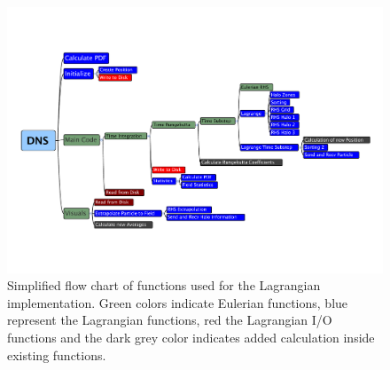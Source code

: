 \documentclass[12pt]{article}
\begin{document}
\begin{figure}[htbp]
	\centering
			\includegraphics[width=\textheight,height=\textwidth, angle=90]{figs/latex_roadmap.pdf}
	\caption[Implementation flow chart]{Simplified flow chart of functions used for the Lagrangian implementation. Green colors indicate Eulerian functions, blue represent the Lagrangian functions, red the Lagrangian I/O functions and the dark grey color indicates added calculation inside existing functions.}
	\label{fig:roadmap}
\end{figure}

\end{document}
